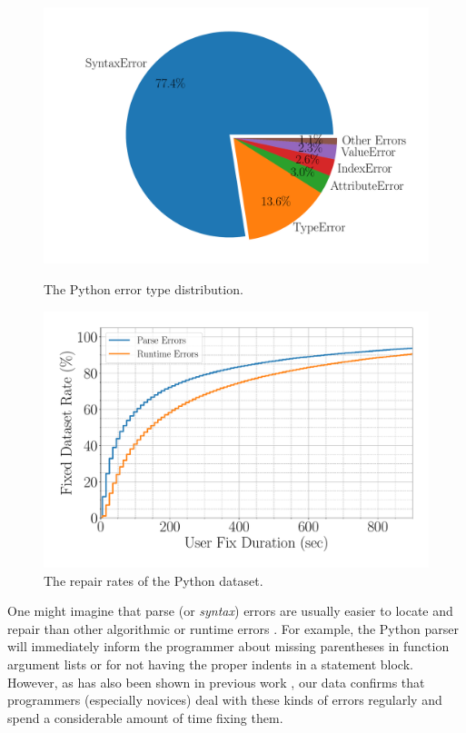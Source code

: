 \begin{figure}[t]
  \centering
  \begin{minipage}[c]{0.50\linewidth}
    \centering
    \includegraphics[width=\linewidth]{error-pie.pdf}
    \caption{The Python error type distribution.}
    \label{fig:error-statistics}
  \end{minipage}
  \begin{minipage}[c]{0.49\linewidth}
      \centering
      \includegraphics[width=\linewidth]{fixed-rate.pdf}
      \caption{The repair rates of the Python dataset.}
      \label{fig:repair-rate}
  \end{minipage}
\end{figure}

One might imagine that parse (or \emph{syntax}) errors are
usually easier to locate and repair than other algorithmic
or runtime errors \citep{Denny_2012}.
%
For example, the Python parser will immediately inform the programmer
about missing parentheses in function argument lists or for not having
the proper indents in a statement block.
%
However, as has also been shown in previous
work \citep{Ahadi_2018, Kummerfeld2003}, our
data confirms that programmers (especially novices)
deal with these kinds of errors regularly and
spend a considerable amount of time fixing them.

